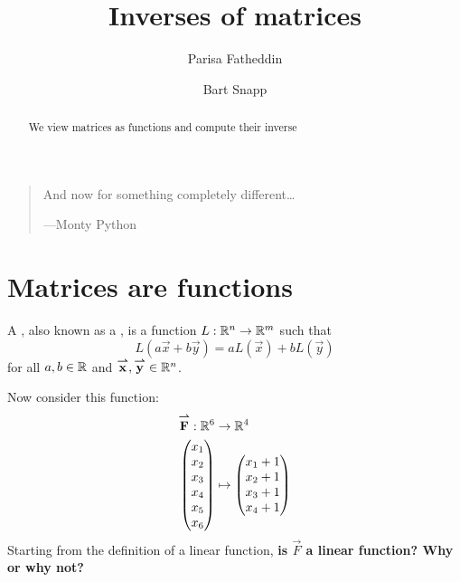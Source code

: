 \documentclass{ximera}
\author{Parisa Fatheddin \and Bart Snapp}
\title{Inverses of matrices}
\begin{document}
\begin{abstract}
  We view matrices as functions and compute their inverse
\end{abstract}
\maketitle



\begin{quote}
  And now for something completely different\dots

  
\hfill ---Monty Python
\end{quote}








\section{Matrices are functions}

\begin{definition}
  A , also known as a , is a function $L:\mathbb{R}^n\to\mathbb{R}^m$ such that
  \[
  L(a\vec{x}+b\vec{y}) = aL(\vec{x}) + bL(\vec{y})
  \]
  for all $a,b\in\mathbb{R}$ and ${\overset{\boldsymbol{\rightharpoonup}}{\mathbf{x}}}\hspace{0in},{\overset{\boldsymbol{\rightharpoonup}}{\mathbf{y}}}\hspace{0in}\in \mathbb{R}^n$.
\end{definition}

\begin{question}
  Now consider this function:
  \begin{align*}
    {\overset{\boldsymbol{\rightharpoonup}}{\mathbf{F}}}\hspace{0in}: \mathbb{R}^6 &\to \mathbb{R}^4\\
    \begin{pmatrix}
      x_1\\
      x_2\\
      x_3\\
      x_4\\
      x_5\\
      x_6
    \end{pmatrix}
    &\mapsto
        \begin{pmatrix}
      x_1+1\\
      x_2+1\\
      x_3+1\\
      x_4+1
    \end{pmatrix}
  \end{align*}
  Starting from the definition of a linear function, \textbf{is $\vec{F}$ a
  linear function? Why or why not?}
\end{question}
\end{document}
